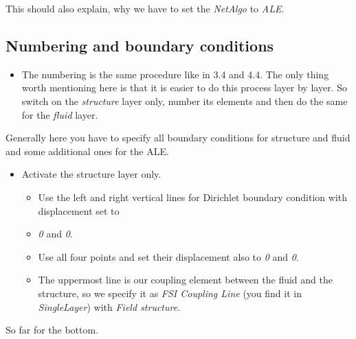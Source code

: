 
This should also explain, why we have to set the \emph{NetAlgo} to
\emph{ALE}.


\subsection{Numbering and boundary conditions}

\begin{itemize}
\item The numbering is the same procedure like in 3.4 and 4.4. The only
thing worth mentioning here is that it is easier to do this process
layer by layer. So switch on the \emph{structure} layer only, number
its elements and then do the same for the \emph{fluid} layer.
\end{itemize}
Generally here you have to specify all boundary conditions for structure and fluid
and some additional ones for the ALE.

\begin{itemize}
\item Activate the structure layer only.

\begin{itemize}
\item Use the left and right vertical lines for Dirichlet boundary condition with displacement
set to
\item \emph{0} and \emph{0}.
\item Use all four points and set their displacement also to \emph{0} and
\emph{0}.
\item The uppermost line is our coupling element between the fluid and the
structure, so we specify it as \emph{FSI Coupling Line} (you find
it in \emph{SingleLayer}) with \emph{Field structure}.
\end{itemize}
\end{itemize}
So far for the bottom.

